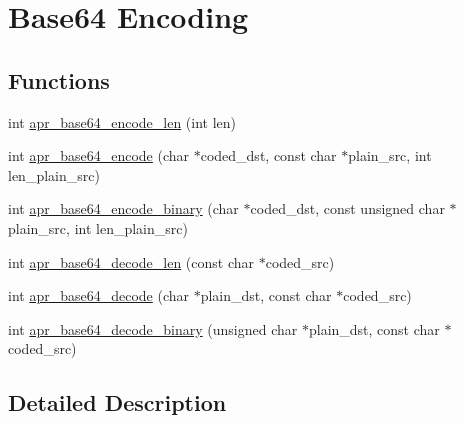 \hypertarget{group___a_p_r___util___base64}{\section{Base64 Encoding}
\label{group___a_p_r___util___base64}
}
\subsection*{Functions}
\begin{DoxyCompactItemize}
\item 
int \hyperlink{group___a_p_r___util___base64_ga5dad9df13a7018e3946a54c8d2c27ae9}{apr\-\_\-base64\-\_\-encode\-\_\-len} (int len)
\item 
int \hyperlink{group___a_p_r___util___base64_ga6176124b05512773de40cc5e899058b9}{apr\-\_\-base64\-\_\-encode} (char $\ast$coded\-\_\-dst, const char $\ast$plain\-\_\-src, int len\-\_\-plain\-\_\-src)
\item 
int \hyperlink{group___a_p_r___util___base64_gae7480ce6b723e71cf91583217d96f1d7}{apr\-\_\-base64\-\_\-encode\-\_\-binary} (char $\ast$coded\-\_\-dst, const unsigned char $\ast$plain\-\_\-src, int len\-\_\-plain\-\_\-src)
\item 
int \hyperlink{group___a_p_r___util___base64_gad1ba714a6708376e6a21722a40a698a2}{apr\-\_\-base64\-\_\-decode\-\_\-len} (const char $\ast$coded\-\_\-src)
\item 
int \hyperlink{group___a_p_r___util___base64_ga1f717903883e7405c2a0d0ec5814f865}{apr\-\_\-base64\-\_\-decode} (char $\ast$plain\-\_\-dst, const char $\ast$coded\-\_\-src)
\item 
int \hyperlink{group___a_p_r___util___base64_ga3d8f1517351d8b7a18b8396642b98975}{apr\-\_\-base64\-\_\-decode\-\_\-binary} (unsigned char $\ast$plain\-\_\-dst, const char $\ast$coded\-\_\-src)
\end{DoxyCompactItemize}


\subsection{Detailed Description}


